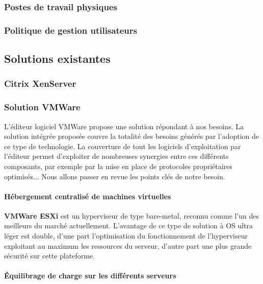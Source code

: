 \subsubsection{Postes de travail physiques}

\subsubsection{Politique de gestion utilisateurs}

\subsection{Solutions existantes}

\subsubsection{Citrix XenServer}

\subsubsection{Solution VMWare}

L'éditeur logiciel VMWare propose une solution répondant à nos besoins. La solution intégrée proposée couvre la totalité des besoins générés par l'adoption de ce type de technologie. La couverture de tout les logiciels d'exploitation par l'éditeur permet d'exploiter de nombreuses synergies entre ces différents composants, par exemple par la mise en place de protocoles propriétaires optimisés... Nous allons passer en revue les points clés de notre besoin.\\

\paragraph{Hébergement centralisé de machines virtuelles}

\textbf{VMWare ESXi} est un hyperviseur de type bare-metal, reconnu comme l'un des meilleurs du marché actuellement. L'avantage de ce type de solution à OS ultra léger est double, d'une part l'optimisation du fonctionnement de l'hyperviseur exploitant au maximum les ressources du serveur, d'autre part une plus grande sécurité sur cette plateforme.

\paragraph{Équilibrage de charge sur les différents serveurs}

